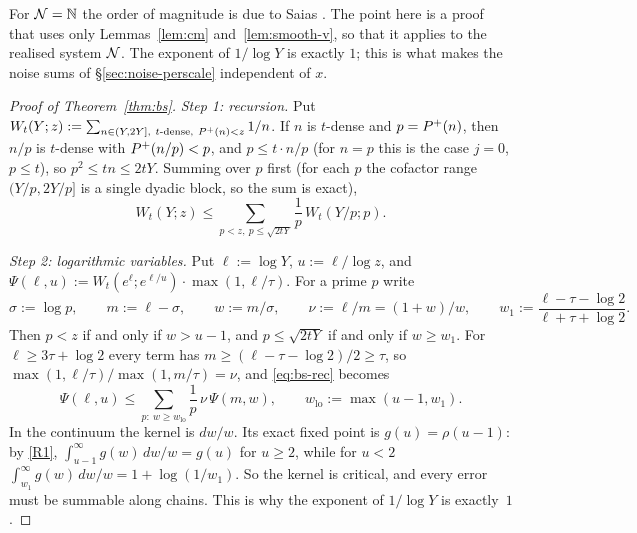 For $\mathcal{N}=\mathbb{N}$ the order of magnitude is due to Saias \cite{Saias1997}. The point here is a proof that uses only
Lemmas~\ref{lem:cm} and~\ref{lem:smooth-v}, so that it applies to the realised system $\mathcal{N}$. The exponent of $1/\log Y$ is
exactly $1$; this is what makes the noise sums of \S\ref{sec:noise-perscale} independent of $x$.

\begin{proof}[Proof of Theorem~\ref{thm:bs}]
\emph{Step 1: recursion.} Put $W_t(Y;z):=\sum_{n\in(Y,2Y],\ t\text{-dense},\ \Pplus(n)<z}1/n$. If $n$ is $t$-dense and
$p=P^{+}(n)$, then $n/p$ is $t$-dense with $P^{+}(n/p)<p$, and $p\le t\cdot n/p$ (for $n=p$ this is the case $j=0$, $p\le t$),
so $p^2\le tn\le2tY$. Summing over $p$
first (for each $p$ the cofactor range $(Y/p,2Y/p]$ is a single dyadic block, so the sum is exact),
\begin{equation}\label{eq:bs-rec}
  W_t(Y;z)\le\sum_{p<z,\ p\le\sqrt{2tY}}\frac1p\,W_t(Y/p;p).
\end{equation}

\emph{Step 2: logarithmic variables.} Put $\ell:=\log Y$, $u:=\ell/\log z$, and
$\Psi(\ell,u):=W_t(e^\ell;e^{\ell/u})\cdot\max(1,\ell/\tau)$. For a prime $p$ write
\[
  \sigma:=\log p,\qquad m:=\ell-\sigma,\qquad w:=m/\sigma,\qquad \nu:=\ell/m=(1+w)/w,\qquad
  w_1:=\frac{\ell-\tau-\log2}{\ell+\tau+\log2}.
\]
Then $p<z$ if and only if $w>u-1$, and $p\le\sqrt{2tY}$ if and only if $w\ge w_1$.
For $\ell\ge3\tau+\log2$ every term has $m\ge(\ell-\tau-\log2)/2\ge\tau$, so
$\max(1,\ell/\tau)/\max(1,m/\tau)=\nu$, and \eqref{eq:bs-rec} becomes
\begin{equation}\label{eq:bs-rec-log}
  \Psi(\ell,u)\le\sum_{p:\ w\ge w_{\mathrm{lo}}}\frac1p\,\nu\,\Psi(m,w),\qquad w_{\mathrm{lo}}:=\max(u-1,w_1).
\end{equation}
In the continuum the kernel is $dw/w$. Its exact fixed point is $g(u)=\rho(u-1)$: by \ref{R1},
$\int_{u-1}^\infty g(w)\,dw/w=g(u)$ for $u\ge2$, while for $u<2$
$\int_{w_1}^\infty g(w)\,dw/w=1+\log(1/w_1)$. So the kernel is critical, and every error must be summable along chains.
This is why the exponent of $1/\log Y$ is exactly~$1$.


\end{proof}
